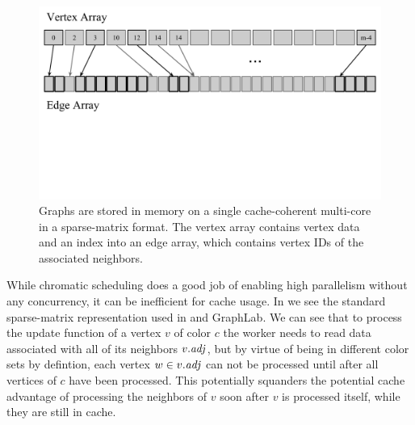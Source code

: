 \begin{figure}[!h]
\centering
\includegraphics[keepaspectratio,width=4.5in,clip,trim=0 5cm 0 0]{figures/sparse_matrix_representation.pdf}
\caption{Graphs are stored in memory on a single cache-coherent
multi-core in a sparse-matrix format.  The vertex array contains
vertex data and an index into an edge array, which contains vertex
IDs of the associated neighbors.}
\label{fig:layout}
\end{figure}


While chromatic scheduling does a good job of enabling high parallelism
without any concurrency, it can be inefficient for cache usage.  In 
 we see the standard sparse-matrix representation
used in  and GraphLab.  We can see that to process
the update function of a vertex $v$ of color $c$ the worker needs to read data
associated with all of its neighbors $\attrib{v}{\id{adj}}$, but 
by virtue of being in different color sets by defintion, each
vertex $w \in \attrib{v}{\id{adj}}$ can not be processed until
after all vertices of $c$ have been processed.  This potentially
squanders the potential cache advantage of processing the neighbors
of $v$ soon after $v$ is processed itself, while they are still
in cache.

